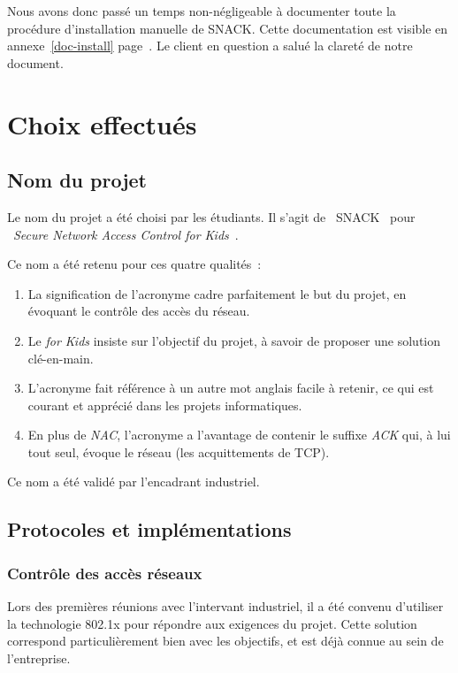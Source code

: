 Nous avons donc passé un temps non-négligeable à documenter toute la procédure d'installation manuelle de SNACK. Cette documentation est visible en annexe~\ref{doc-install} page~\pageref{doc-install}. Le client en question a salué la clareté de notre document.

\section{Choix effectués}
\subsection{Nom du projet}

Le nom du projet a été choisi par les étudiants. Il s'agit de \og~SNACK~\fg{} pour \og~\emph{Secure Network Access Control for Kids}~\fg.

Ce nom a été retenu pour ces quatre qualités~:

\begin{enumerate}
\item La signification de l'acronyme cadre parfaitement le but du projet, en évoquant le contrôle des accès du réseau.
\item Le \emph{for Kids} insiste sur l'objectif du projet, à savoir de proposer une solution clé-en-main.
\item L'acronyme fait référence à un autre mot anglais facile à retenir, ce qui est courant et apprécié dans les projets informatiques.
\item En plus de \emph{NAC}, l'acronyme a l'avantage de contenir le suffixe \emph{ACK} qui, à lui tout seul, évoque le réseau (les acquittements de TCP).
\end{enumerate}

Ce nom a été validé par l'encadrant industriel.

\subsection{Protocoles et implémentations}
\subsubsection{Contrôle des accès réseaux}

Lors des premières réunions avec l'intervant industriel, il a été convenu d'utiliser la technologie 802.1x pour répondre aux exigences du projet. Cette solution correspond particulièrement bien avec les objectifs, et est déjà connue au sein de l'entreprise.

